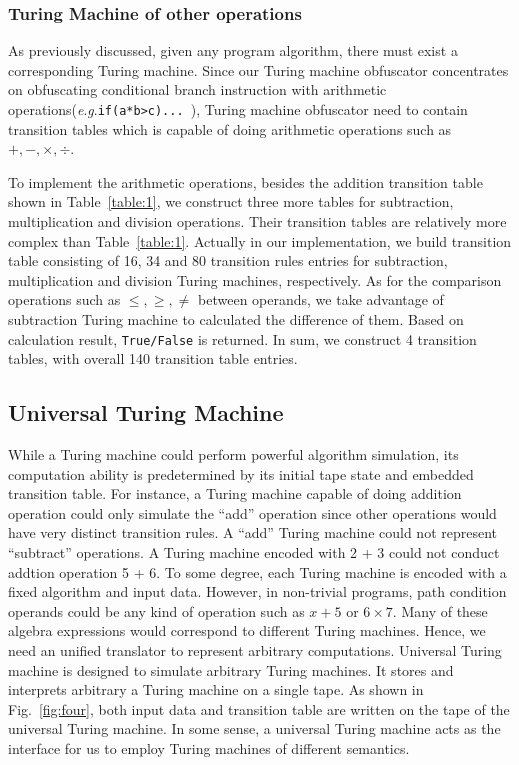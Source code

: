 \documentclass[lnicst]{svmultln}
\newcommand{\F}{Fig.}
\newcommand{\eg}{\textit{e}.\textit{g}.}
\begin{document}
\subsubsection{Turing Machine of other operations}
As previously discussed, given any program algorithm, there must exist a
corresponding Turing machine. Since our Turing machine obfuscator concentrates
on obfuscating conditional branch instruction with arithmetic operations(\eg\lstinline{if(a*b>c)... }), Turing
machine obfuscator need to contain transition tables which is capable of doing
arithmetic operations such as \(+, -, \times, \div\).

To implement the arithmetic operations, besides the addition transition table shown in
Table~\ref{table:1}, we construct three more tables for subtraction,
multiplication and division operations. Their transition tables are relatively
more complex than Table~\ref{table:1}. Actually in our implementation, we build
transition table consisting of 16, 34 and 80 transition rules entries for subtraction,
multiplication and division Turing machines, respectively.
As for the comparison operations such as \(\leq, \geq, \neq\) between operands, we take advantage of 
subtraction Turing machine to calculated the difference of them. Based on calculation result, \lstinline{True/False} is 
returned. In sum, we construct 4 transition tables, with overall 140
  transition table entries.



\subsection{Universal Turing Machine}
While a Turing machine could perform powerful algorithm simulation, its
computation ability is predetermined by its initial tape state and embedded transition table. For
instance, a Turing machine capable of doing addition operation could only
simulate the ``add'' operation since other operations would have very distinct
transition rules. A ``add'' Turing machine could not represent ``subtract''
operations. A Turing machine encoded with 2 + 3 could not conduct addtion operation 5 + 6.
To some degree, each Turing machine is encoded with a fixed
algorithm and input data. However, in non-trivial programs, path condition operands could be any kind
of operation such as \(x + 5\) or \(6 \times 7 \). Many of these algebra
expressions would correspond to different Turing machines. Hence, we need an
unified translator to represent arbitrary computations. Universal Turing machine
is designed to simulate arbitrary Turing machines. It stores and interprets
arbitrary a Turing machine on a single tape. As shown in \F~\ref{fig:four}, both
input data and transition table are written on the tape of the universal
Turing machine. In some sense, a universal Turing machine acts as the interface
for us to employ Turing machines of different semantics.
\end{document}
